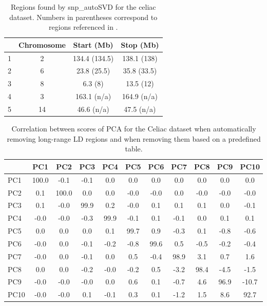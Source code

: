 \documentclass[a4paper, 11pt]{article}
\begin{document}
\begin{table}[htpb]
\centering
\begin{tabular}{lccc}
  \hline
 & Chromosome & Start (Mb) & Stop (Mb) \\ 
  \hline
1 &  2 & 134.4 (134.5) & 138.1 (138) \\ 
  2 &  6 & 23.8 (25.5) & 35.8 (33.5) \\ 
  3 &  8 & 6.3 (8) & 13.5 (12) \\ 
  4 &  3 & 163.1 (n/a) & 164.9 (n/a) \\ 
  5 & 14 & 46.6 (n/a) & 47.5 (n/a) \\ 
   \hline
\end{tabular}
\caption{Regions found by snp\_autoSVD for the celiac dataset. Numbers in parentheses correspond to regions referenced in \cite{Price2008}.}
\label{tab:lrldr-celiac}
\end{table}

\begin{table}[htpb]
\centering
\begin{tabular}{l|cccccccccc}
  \hline
 & PC1 & PC2 & PC3 & PC4 & PC5 & PC6 & PC7 & PC8 & PC9 & PC10 \\
  \hline
PC1 & 100.0 & -0.1 & -0.1 & 0.0 & 0.0 & 0.0 & 0.0 & 0.0 & 0.0 & 0.0 \\
  PC2 & 0.1 & 100.0 & 0.0 & 0.0 & -0.0 & -0.0 & 0.0 & -0.0 & -0.0 & -0.0 \\
  PC3 & 0.1 & -0.0 & 99.9 & 0.2 & -0.0 & 0.1 & 0.1 & 0.1 & 0.0 & -0.1 \\
  PC4 & -0.0 & -0.0 & -0.3 & 99.9 & -0.1 & 0.1 & -0.1 & 0.0 & 0.1 & 0.1 \\
  PC5 & 0.0 & 0.0 & 0.0 & 0.1 & 99.7 & 0.9 & -0.3 & 0.1 & -0.8 & -0.6 \\
  PC6 & -0.0 & 0.0 & -0.1 & -0.2 & -0.8 & 99.6 & 0.5 & -0.5 & -0.2 & -0.4 \\
  PC7 & -0.0 & 0.0 & -0.1 & 0.0 & 0.5 & -0.4 & 98.9 & 3.1 & 0.7 & 1.6 \\
  PC8 & 0.0 & 0.0 & -0.2 & -0.0 & -0.2 & 0.5 & -3.2 & 98.4 & -4.5 & -1.5 \\
  PC9 & -0.0 & -0.0 & -0.0 & 0.0 & 0.6 & 0.1 & -0.7 & 4.6 & 96.9 & -10.7 \\
  PC10 & -0.0 & -0.0 & 0.1 & -0.1 & 0.3 & 0.1 & -1.2 & 1.5 & 8.6 & 92.7 \\
   \hline
\end{tabular}
\caption{Correlation between scores of PCA for the Celiac dataset  when automatically removing long-range LD regions and when removing them based on a predefined table.}
\label{tab:pc-celiac}
\end{table}
\end{document}
